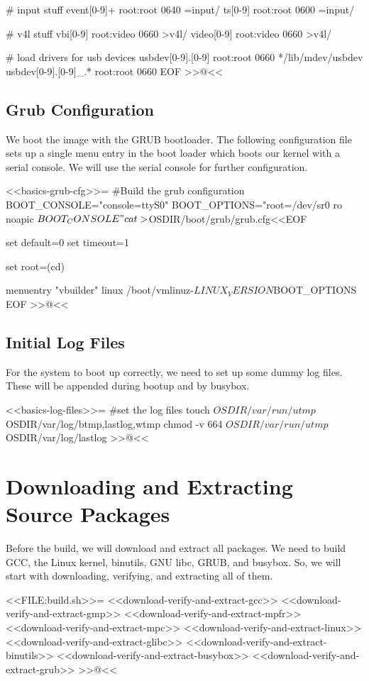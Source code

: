 # input stuff
event[0-9]+     root:root 0640 =input/
ts[0-9]         root:root 0600 =input/

# v4l stuff
vbi[0-9]        root:video 0660 >v4l/
video[0-9]      root:video 0660 >v4l/

# load drivers for usb devices
usbdev[0-9].[0-9]       root:root 0660 */lib/mdev/usbdev
usbdev[0-9].[0-9]_.*    root:root 0660
EOF
>>@<<

\subsection{Grub Configuration}

We boot the image with the GRUB bootloader. The following configuration file
sets up a single menu entry in the boot loader which boots our kernel with a
serial console.  We will use the serial console for further configuration.

<<basics-grub-cfg>>=
#Build the grub configuration
BOOT_CONSOLE="console=ttyS0"
BOOT_OPTIONS="root=/dev/sr0 ro noapic $BOOT_CONSOLE"
cat > ${OSDIR}/boot/grub/grub.cfg<<EOF

set default=0
set timeout=1

set root=(cd)

menuentry "vbuilder" {
        linux   /boot/vmlinuz-${LINUX_VERSION} ${BOOT_OPTIONS}
}
EOF
>>@<<

\subsection{Initial Log Files}

For the system to boot up correctly, we need to set up some dummy log files.
These will be appended during bootup and by busybox.

<<basics-log-files>>=
#set the log files
touch ${OSDIR}/var/run/utmp ${OSDIR}/var/log/{btmp,lastlog,wtmp}
chmod -v 664 ${OSDIR}/var/run/utmp ${OSDIR}/var/log/lastlog
>>@<<

\section{Downloading and Extracting Source Packages}

Before the build, we will download and extract all packages.  We need to build
GCC, the Linux kernel, binutils, GNU libc, GRUB, and busybox.  So, we will start
with downloading, verifying, and extracting all of them.

<<FILE:build.sh>>=
    <<download-verify-and-extract-gcc>>
    <<download-verify-and-extract-gmp>>
    <<download-verify-and-extract-mpfr>>
    <<download-verify-and-extract-mpc>>
    <<download-verify-and-extract-linux>>
    <<download-verify-and-extract-glibc>>
    <<download-verify-and-extract-binutils>>
    <<download-verify-and-extract-busybox>>
    <<download-verify-and-extract-grub>>
>>@<<

